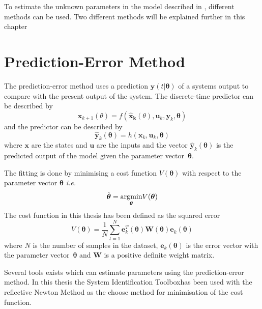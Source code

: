To estimate the unknown parameters in the \abbrROV model described in , different methods can be used. Two different methods will be explained further in this chapter  


\section{Prediction-Error Method}
The prediction-error method uses a prediction $\hat{\boldsymbol{y}}(t|\boldsymbol{\theta})$ of a systems output to compare with the present output of the system. The discrete-time predictor can be described by 
\begin{equation}
\boldsymbol{x}_{k+1}(\theta) = f(\boldsymbol{\hat{x}_k}(\theta), \boldsymbol{u}_k,\boldsymbol{y}_k, \boldsymbol{\theta})
\end{equation}
and the predictor can be described by
\begin{equation}
\hat{\boldsymbol{y}}_k(\boldsymbol{\theta}) = h(\boldsymbol{x}_k, \boldsymbol{u}_k, \boldsymbol{\theta})
\end{equation}
where $\boldsymbol{x}$ are the states and $\boldsymbol{u}$ are the inputs and the vector $\hat{\boldsymbol{y}}_k(\boldsymbol{\theta})$ is the predicted output of the model given the parameter vector~$\boldsymbol{\theta}$. 

The fitting is done by minimising a cost function $V(\boldsymbol{\theta})$ with respect to the parameter vector $\boldsymbol{\theta}$ \emph{i.e.}
\begin{equation}
\hat{\boldsymbol{\theta}} = \underset{\boldsymbol{\theta}}{\operatorname*{\arg\!\min}} V(\boldsymbol{\theta})
\end{equation}
The cost function in this thesis has been defined as the squared error
\begin{equation}
    V(\boldsymbol{\theta}) = \frac{1}{N} \sum_{t=1}^{N} \boldsymbol{e}^T_k(\boldsymbol{\theta}) \boldsymbol{W}(\boldsymbol{\theta})  \boldsymbol{e}_k(\boldsymbol{\theta})
\end{equation}
where $N$ is the number of samples in the dataset, $\boldsymbol{e}_k(\boldsymbol{\theta})$ is the error vector with the parameter vector~$\boldsymbol{\theta}$ and $\boldsymbol{W}$ is a positive definite weight matrix.

Several tools exists	which can estimate parameters using the prediction-error method. In this thesis the System Identification Toolbox\texttrademark has been used with the reflective Newton Method as the choose method for minimisation of the cost function.

